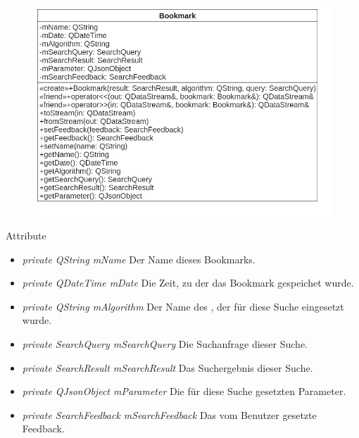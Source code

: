 \begin{figure}[H]
\centering
\includegraphics[scale=0.5]{img/Klassendiagramm/Klassen/Model/Bookmark}
\label{fig:bookmark}
\end{figure}

Attribute
\begin{itemize}
\item\textit{private QString mName} Der Name dieses Bookmarks.
\item\textit{private QDateTime mDate} Die Zeit, zu der das Bookmark gespeichet wurde.
\item\textit{private QString mAlgorithm} Der Name des , der für diese Suche eingesetzt wurde.
\item\textit{private SearchQuery mSearchQuery} Die Suchanfrage dieser Suche.
\item\textit{private SearchResult mSearchResult} Das Suchergebnis dieser Suche.
\item\textit{private QJsonObject mParameter} Die für diese Suche gesetzten Parameter.
\item\textit{private SearchFeedback mSearchFeedback} Das vom Benutzer gesetzte Feedback.
\end{itemize}


